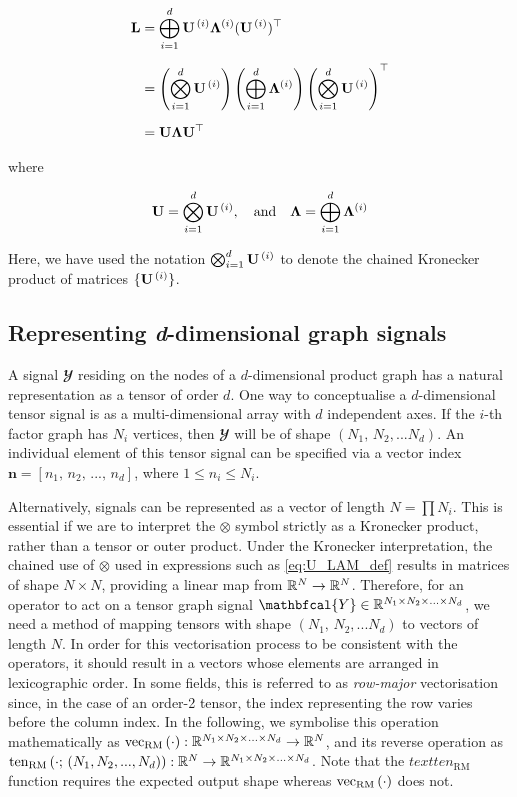 \begin{align}
    \mathbf{L} &= \bigoplus_{i=1}^d \mathbf{U}^{\,(i)} \mathbf{\Lambda}^{(i)} (\mathbf{U}^{\,(i)})^\top \notag \\[0.2cm]
    &= \left( \bigotimes_{i=1}^d  \mathbf{U}^{\,(i)} \right) \left(\bigoplus_{i=1}^d \mathbf{\Lambda}^{(i)} \right) \left(\bigotimes_{i=1}^d  \mathbf{U}^{\,(i)} \right)^\top \notag \\[0.2cm]
    &= \mathbf{U} \mathbf{\Lambda} \mathbf{U}^\top 
\end{align}

\noindent where 

\begin{equation}
    \label{eq:U_LAM_def}
    \mathbf{U} =  \bigotimes_{i=1}^d  \mathbf{U}^{\,(i)} , \quad \text{and} \quad \mathbf{\Lambda} =  \bigoplus_{i=1}^d \mathbf{\Lambda}^{(i)}
\end{equation}


Here, we have used the notation $\bigotimes_{i=1}^d  \mathbf{U}^{\,(i)}$ to denote the chained Kronecker product of matrices $\{\mathbf{U}^{\,(i)}  \}$. 

\subsection{Representing \textit{d}-dimensional graph signals}

A signal $\mathbfcal{Y}$ residing on the nodes of a $d$-dimensional product graph has a natural representation as a tensor of order $d$. One way to conceptualise a $d$-dimensional tensor signal is as a multi-dimensional array with $d$ independent axes. If the $i$-th factor graph has $N_i$ vertices, then $\mathbfcal{Y}$ will be of shape $(N_1, \, N_2 , ... N_d)$. An individual element of this tensor signal can be specified via a vector index $\mathbf{n} = [n_1,\, n_2,\, ...,\, n_d]$, where $1\leq n_i \leq N_i$.

Alternatively, signals can be represented as a vector of length $N = \prod N_i$. This is essential if we are to interpret the $\otimes$ symbol strictly as a Kronecker product, rather than a tensor or outer product. Under the Kronecker interpretation, the chained use of $\otimes$ used in expressions such as \cref{eq:U_LAM_def} results in matrices of shape $N \times N$, providing a linear map from $\mathbb{R}^{N} \rightarrow \mathbb{R}^{N}$. Therefore, for an operator to act on a tensor graph signal $\mathbfcal{Y} \in \R^{N_1 \times N_2 \times ... \times N_d}$, we need a method of mapping tensors with shape $(N_1, \, N_2 , ... N_d)$ to vectors of length $N$. In order for this vectorisation process to be consistent with the operators, it should result in a vectors whose elements are arranged in lexicographic order. In some fields, this is referred to as \textit{row-major} vectorisation since, in the case of an order-2 tensor, the index representing the row varies before the column index. In the following, we symbolise this operation mathematically as $\text{\textup{vec}}_{\text{\textup{RM}}}\left(\cdot\right): \mathbb{R}^{N_1 \times N_2 \times ... \times N_d} \rightarrow \mathbb{R}^N$, and its reverse operation as $\text{ten}_\text{RM}\left(\cdot; \, (N_1, N_2, ..., N_d)\right): \mathbb{R}^N \rightarrow \mathbb{R}^{N_1 \times N_2 \times ... \times N_d}$. Note that the $text{ten}_\text{RM}$ function requires the expected output shape whereas $\text{\textup{vec}}_{\text{\textup{RM}}}\left(\cdot\right)$ does not. 

